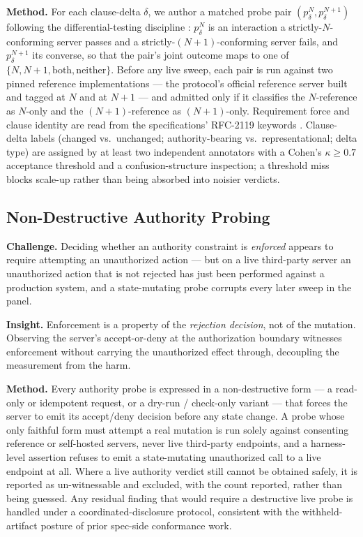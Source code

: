\documentclass[11pt]{article}
\begin{document}
\textbf{Method.} For each clause-delta $\delta$, we author a matched probe pair $(p_\delta^N, p_\delta^{N+1})$ following the differential-testing discipline \citep{mckeeman1998, yang2011csmith}: $p_\delta^N$ is an interaction a strictly-$N$-conforming server passes and a strictly-$(N{+}1)$-conforming server fails, and $p_\delta^{N+1}$ its converse, so that the pair's joint outcome maps to one of $\{N, N{+}1, \text{both}, \text{neither}\}$. Before any live sweep, each pair is run against two pinned reference implementations --- the protocol's official reference server built and tagged at $N$ and at $N{+}1$ --- and admitted only if it classifies the $N$-reference as $N$-only and the $(N{+}1)$-reference as $(N{+}1)$-only. Requirement force and clause identity are read from the specifications' RFC-2119 keywords \citep{rfc2119}. Clause-delta labels (changed vs.\ unchanged; authority-bearing vs.\ representational; delta type) are assigned by at least two independent annotators with a Cohen's $\kappa \geq 0.7$ acceptance threshold \citep{cohen1960} and a confusion-structure inspection; a threshold miss blocks scale-up rather than being absorbed into noisier verdicts.

\subsection{Non-Destructive Authority Probing}

\textbf{Challenge.} Deciding whether an authority constraint is \emph{enforced} appears to require attempting an unauthorized action --- but on a live third-party server an unauthorized action that is not rejected has just been performed against a production system, and a state-mutating probe corrupts every later sweep in the panel.

\textbf{Insight.} Enforcement is a property of the \emph{rejection decision}, not of the mutation. Observing the server's accept-or-deny at the authorization boundary witnesses enforcement without carrying the unauthorized effect through, decoupling the measurement from the harm.

\textbf{Method.} Every authority probe is expressed in a non-destructive form --- a read-only or idempotent request, or a dry-run / check-only variant --- that forces the server to emit its accept/deny decision before any state change. A probe whose only faithful form must attempt a real mutation is run solely against consenting reference or self-hosted servers, never live third-party endpoints, and a harness-level assertion refuses to emit a state-mutating unauthorized call to a live endpoint at all. Where a live authority verdict still cannot be obtained safely, it is reported as un-witnessable and excluded, with the count reported, rather than being guessed. Any residual finding that would require a destructive live probe is handled under a coordinated-disclosure protocol, consistent with the withheld-artifact posture of prior spec-side conformance work.
\end{document}
